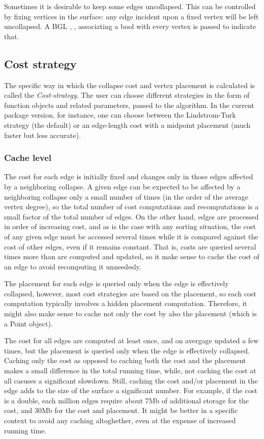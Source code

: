 Sometimes it is desirable to keep some edges uncollapsed. This can be controlled by fixing vertices in the surface: any edge incident upon a fixed vertex will be left uncollapsed. A BGL , , associating a bool with every vertex is passed to indicate that.

\subsection{Cost strategy}

The specific way in which the collapse cost and vertex placement is calculated is called the {\em Cost-strategy}.
The user can choose different strategies in the form of function objects and related parameters, passed to the algorithm.
In the current package version, for instance, one can choose between the Lindstrom-Turk strategy (the default) or an edge-length cost with a midpoint placement (much faster but less accurate).

\subsubsection{Cache level}

The cost for each edge is initially fixed and changes only in those edges affected by a neighboring collapse. A given edge can be expected to be affected by a neighboring collapse only a small number of times (in the order of the average vertex degree), so the total number of cost computations and recomputations is a small factor of the total number of edges. On the other hand, edges are processed in order of increasing cost, and as is the case with any sorting situation, the cost of any given edge must be accessed several times while it is compared against the cost of other edges, even if it remains constant. That is, costs are queried several times more than are computed and updated, so it make sense to cache the cost of an edge to avoid recomputing it unneedesly.

The placement for each edge is queried only when the edge is effectively collapsed, however, most cost strategies are based on the placement, so each cost computation typically involves a hidden placement computation. Therefore, it might also make sense to cache not only the cost by also the placement (which is a Point object).

The cost for all edges are computed at least once, and on avergage updated a few times, but the placement is queried only when the edge is effectively collapsed. Caching only the cost as opposed to caching both the cost and the placement makes a small difference in the total running time, while, not caching the cost at all casuses a significant slowdown. Still, caching the cost and/or placement in the edge adds to the size of the surface a significant number. For example, if the cost is a double, each million edges require about 7Mb of additional storage for the cost, and 30Mb for the cost and placement. It might be better in a specific context to avoid any caching altoghether, even at the expense of increased running time.

